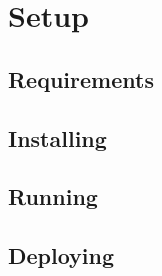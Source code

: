 \section{Setup} 
\subsection{Requirements}
\subsection{Installing}
\subsection{Running}
\subsection{Deploying}
